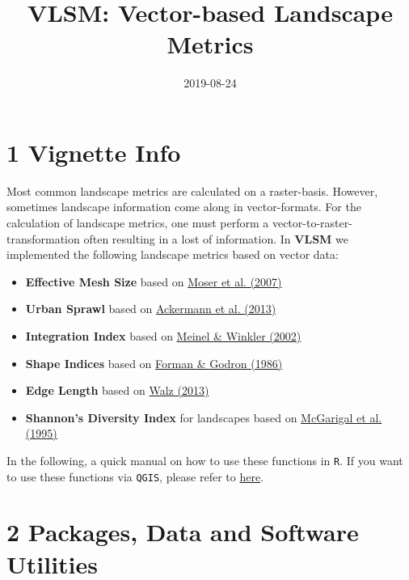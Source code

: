 \documentclass[]{article}
\title{VLSM: Vector-based Landscape Metrics}
\author{}
\date{2019-08-24}
\providecommand{\tightlist}{%
  \setlength{\itemsep}{0pt}\setlength{\parskip}{0pt}}
\begin{document}
\maketitle

\section{1 Vignette Info}\label{vignette-info}

Most common landscape metrics are calculated on a raster-basis. However,
sometimes landscape information come along in vector-formats. For the
calculation of landscape metrics, one must perform a
vector-to-raster-transformation often resulting in a lost of
information. In \textbf{VLSM} we implemented the following landscape
metrics based on vector data:

\begin{itemize}
\tightlist
\item
  \textbf{Effective Mesh Size} based on
  \href{https://doi.org/10.1007/s10980-006-9023-0}{Moser et al. (2007)}
\item
  \textbf{Urban Sprawl} based on
  \href{https://www.schulthess.com/buchshop/detail/ISBN-9783784340326/Ackermann-Werne-Schweiger-Manue-Sukopp-Ulrich-fuer-Naturschutz-BfN-Bundesam-Editor/Indikatoren-zur-biologischen-Vielfalt?bpmbutton211549=1\&bpmtoken=}{Ackermann
  et al. (2013)}
\item
  \textbf{Integration Index} based on
  \href{https://www2.ioer.de/recherche/pdf/2002_meinel_earsel.pdf}{Meinel
  \& Winkler (2002)}
\item
  \textbf{Shape Indices} based on
  \href{https://link.springer.com/journal/10980}{Forman \& Godron
  (1986)}
\item
  \textbf{Edge Length} based on
  \href{http://rosdok.uni-rostock.de/file/rosdok_disshab_0000000980/rosdok_derivate_0000005089/Habilitationsschrift_Walz_2013.pdf}{Walz
  (2013)}
\item
  \textbf{Shannon's Diversity Index} for landscapes based on
  \href{https://www.fs.usda.gov/treesearch/pubs/3064}{McGarigal et al.
  (1995)}
\end{itemize}

In the following, a quick manual on how to use these functions in
\texttt{R}. If you want to use these functions via \texttt{QGIS}, please
refer to \href{}{here}.

\section{2 Packages, Data and Software
Utilities}\label{packages-data-and-software-utilities}
\end{document}
